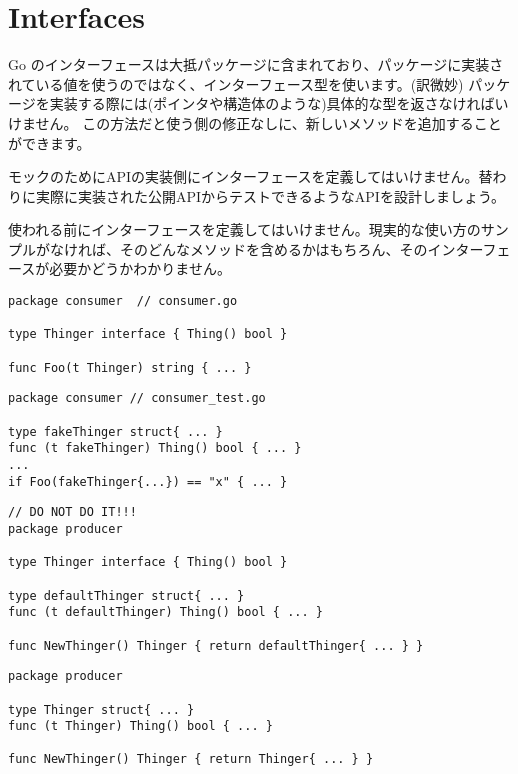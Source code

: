 \section{Interfaces}

Go のインターフェースは大抵パッケージに含まれており、パッケージに実装されている値を使うのではなく、インターフェース型を使います。(訳微妙) パッケージを実装する際には(ポインタや構造体のような)具体的な型を返さなければいけません。 この方法だと使う側の修正なしに、新しいメソッドを追加することができます。

モックのためにAPIの実装側にインターフェースを定義してはいけません。替わりに実際に実装された公開APIからテストできるようなAPIを設計しましょう。

使われる前にインターフェースを定義してはいけません。現実的な使い方のサンプルがなければ、そのどんなメソッドを含めるかはもちろん、そのインターフェースが必要かどうかわかりません。

\begin{lstlisting}[]
package consumer  // consumer.go

type Thinger interface { Thing() bool }

func Foo(t Thinger) string { ... }
\end{lstlisting}



\begin{lstlisting}[]
package consumer // consumer_test.go

type fakeThinger struct{ ... }
func (t fakeThinger) Thing() bool { ... }
...
if Foo(fakeThinger{...}) == "x" { ... }
\end{lstlisting}



\begin{lstlisting}[]
// DO NOT DO IT!!!
package producer

type Thinger interface { Thing() bool }

type defaultThinger struct{ ... }
func (t defaultThinger) Thing() bool { ... }

func NewThinger() Thinger { return defaultThinger{ ... } }
\end{lstlisting}



\begin{lstlisting}[]
package producer

type Thinger struct{ ... }
func (t Thinger) Thing() bool { ... }

func NewThinger() Thinger { return Thinger{ ... } }
\end{lstlisting}


